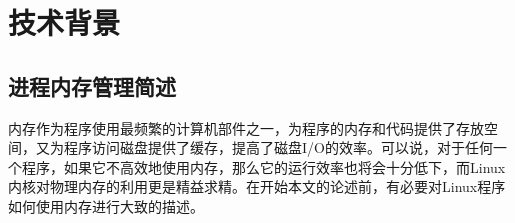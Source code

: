 
\chapter{技术背景}
\label{chap:RL}
\section{进程内存管理简述}
内存作为程序使用最频繁的计算机部件之一，为程序的内存和代码提供了存放空间，又为程序访问磁盘提供了缓存，提高了磁盘I/O的效率。可以说，对于任何一个程序，如果它不高效地使用内存，那么它的运行效率也将会十分低下，而Linux内核\cite{linux}对物理内存的利用更是精益求精。在开始本文的论述前，有必要对Linux程序如何使用内存进行大致的描述。
